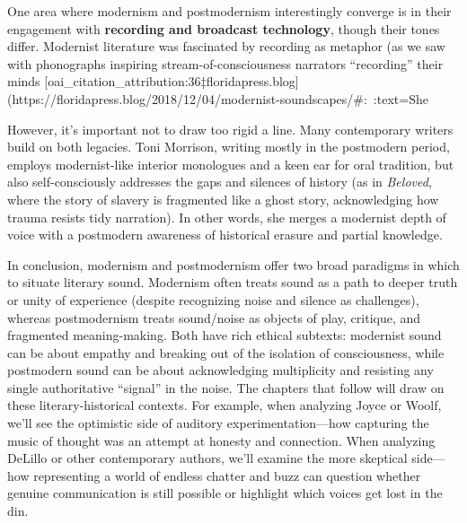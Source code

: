 \documentclass[12pt]{report}
\begin{document}
One area where modernism and postmodernism interestingly converge is in their engagement with \textbf{recording and broadcast technology}, though their tones differ. Modernist literature was fascinated by recording as metaphor (as we saw with phonographs inspiring stream-of-consciousness narrators “recording” their minds [oai_citation_attribution:36‡floridapress.blog](https://floridapress.blog/2018/12/04/modernist-soundscapes/#:~:text=She%

However, it’s important not to draw too rigid a line. Many contemporary writers build on both legacies. Toni Morrison, writing mostly in the postmodern period, employs modernist-like interior monologues and a keen ear for oral tradition, but also self-consciously addresses the gaps and silences of history (as in \textit{Beloved}, where the story of slavery is fragmented like a ghost story, acknowledging how trauma resists tidy narration). In other words, she merges a modernist depth of voice with a postmodern awareness of historical erasure and partial knowledge.

In conclusion, modernism and postmodernism offer two broad paradigms in which to situate literary sound. Modernism often treats sound as a path to deeper truth or unity of experience (despite recognizing noise and silence as challenges), whereas postmodernism treats sound/noise as objects of play, critique, and fragmented meaning-making. Both have rich ethical subtexts: modernist sound can be about empathy and breaking out of the isolation of consciousness, while postmodern sound can be about acknowledging multiplicity and resisting any single authoritative “signal” in the noise. The chapters that follow will draw on these literary-historical contexts. For example, when analyzing Joyce or Woolf, we’ll see the optimistic side of auditory experimentation—how capturing the music of thought was an attempt at honesty and connection. When analyzing DeLillo or other contemporary authors, we’ll examine the more skeptical side—how representing a world of endless chatter and buzz can question whether genuine communication is still possible or highlight which voices get lost in the din.
\end{document}
